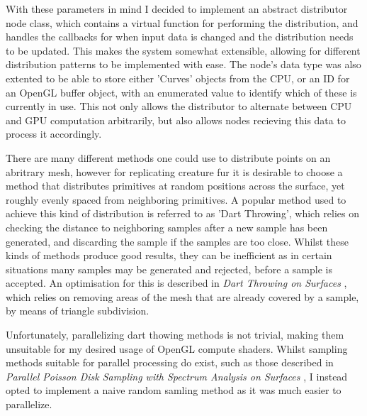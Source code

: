 \documentclass[]{acmsiggraph}
\begin{document}
With these parameters in mind I decided to implement an abstract distributor node class, which contains a virtual function for performing the distribution, and handles the callbacks for when input data is changed and the distribution needs to be updated. This makes the system somewhat extensible, allowing for different distribution patterns to be implemented with ease. The node's data type was also extented to be able to store either 'Curves' objects from the CPU, or an ID for an OpenGL buffer object, with an enumerated value to identify which of these is currently in use. This not only allows the distributor to alternate between CPU and GPU computation arbitrarily, but also allows nodes recieving this data to process it accordingly.

There are many different methods one could use to distribute points on an abritrary mesh, however for replicating creature fur it is desirable to choose a method that distributes primitives at random positions across the surface, yet roughly evenly spaced from neighboring primitives. A popular method used to achieve this kind of distribution is referred to as 'Dart Throwing', which relies on checking the distance to neighboring samples after a new sample has been generated, and discarding the sample if the samples are too close. Whilst these kinds of methods produce good results, they can be inefficient as in certain situations many samples may be generated and rejected, before a sample is accepted. An optimisation for this is described in \textit{Dart Throwing on Surfaces} \cite{dartThrowing}, which relies on removing areas of the mesh that are already covered by a sample, by means of triangle subdivision.

Unfortunately, parallelizing dart thowing methods is not trivial, making them unsuitable for my desired usage of OpenGL compute shaders. Whilst sampling methods suitable for parallel processing do exist, such as those described in \textit{Parallel Poisson Disk Sampling with Spectrum Analysis on Surfaces} \cite{parallelPoisson}, I instead opted to implement a naive random samling method as it was much easier to parallelize.


\end{document}
